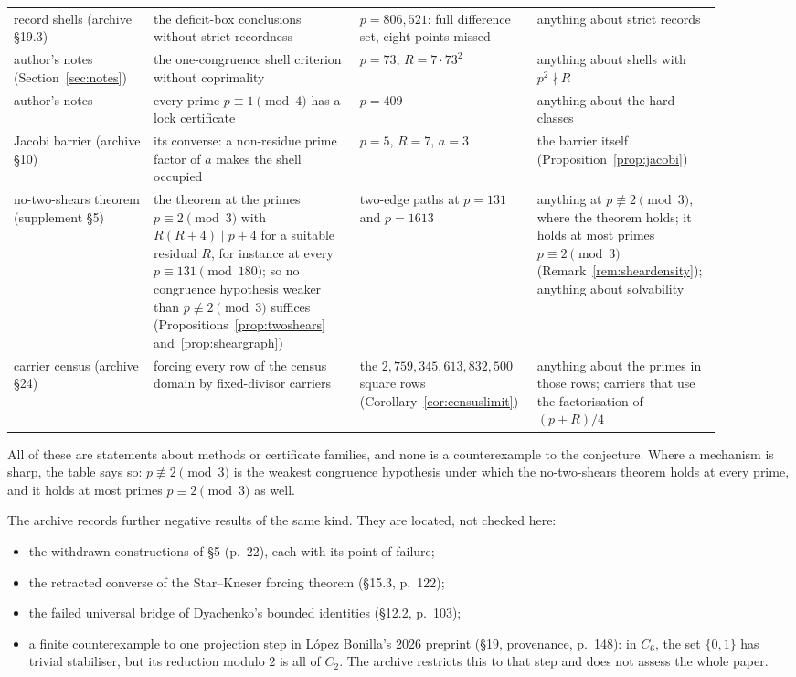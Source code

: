 \begin{center}
\begin{longtable}{@{}>{\raggedright\arraybackslash}p{0.19\linewidth}>{\raggedright\arraybackslash}p{0.29\linewidth}>{\raggedright\arraybackslash}p{0.21\linewidth}>{\raggedright\arraybackslash}p{0.21\linewidth}@{}}
record shells (archive §19.3) & the deficit-box conclusions without strict recordness & $p=806{,}521$: full difference set, eight points missed & anything about strict records\\
author's notes (Section~\ref{sec:notes}) & the one-congruence shell criterion without coprimality & $p=73$, $R=7\cdot73^2$ & anything about shells with $p^2\nmid R$\\
author's notes & every prime $p\equiv1\pmod4$ has a lock certificate & $p=409$ & anything about the hard classes\\
Jacobi barrier (archive §10) & its converse: a non-residue prime factor of $a$ makes the shell occupied & $p=5$, $R=7$, $a=3$ & the barrier itself (Proposition~\ref{prop:jacobi})\\
no-two-shears theorem (supplement §5) & the theorem at the primes $p\equiv2\pmod3$ with $R(R+4)\mid p+4$ for a suitable residual $R$, for instance at every $p\equiv131\pmod{180}$; so no congruence hypothesis weaker than $p\not\equiv2\pmod3$ suffices (Propositions~\ref{prop:twoshears} and~\ref{prop:sheargraph}) & two-edge paths at $p=131$ and $p=1613$ & anything at $p\not\equiv2\pmod3$, where the theorem holds; it holds at most primes $p\equiv2\pmod3$ (Remark~\ref{rem:sheardensity}); anything about solvability\\
carrier census (archive §24) & forcing every row of the census domain by fixed-divisor carriers & the $2{,}759{,}345{,}613{,}832{,}500$ square rows (Corollary~\ref{cor:censuslimit}) & anything about the primes in those rows; carriers that use the factorisation of $(p+R)/4$\\
\bottomrule
\end{longtable}
\end{center}
All of these are statements about methods or certificate families, and none is a counterexample to the conjecture. Where a mechanism is sharp, the table says so: $p\not\equiv2\pmod3$ is the weakest congruence hypothesis under which the no-two-shears theorem holds at every prime, and it holds at most primes $p\equiv2\pmod3$ as well.

The archive records further negative results of the same kind. They are \textsf{located}, not checked here:
\begin{itemize}
\item the withdrawn constructions of §5 (p.~22), each with its point of failure;
\item the retracted converse of the Star--Kneser forcing theorem (§15.3, p.~122);
\item the failed universal bridge of Dyachenko's bounded identities (§12.2, p.~103);
\item a finite counterexample to one projection step in López Bonilla's 2026 preprint (§19, provenance, p.~148): in $C_6$, the set $\{0,1\}$ has trivial stabiliser, but its reduction modulo $2$ is all of $C_2$. The archive restricts this to that step and does not assess the whole paper.
\end{itemize}
